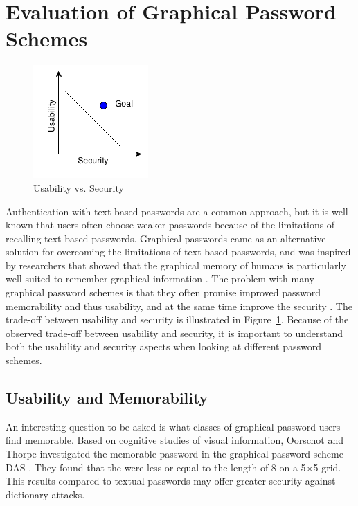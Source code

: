   \clearpage
 \section{Evaluation of Graphical Password Schemes} \label{sec:evaluation}

  \begin{figure}
    \vspace{-20pt}
    \begin{center}
      \includegraphics[scale=0.75]{pics/UsabilityVsSecurity.png}
    \end{center}
    \vspace{-20pt}
    \caption{Usability vs. Security}
    \vspace{-10pt}
    \label{fig:usabilitysecurity}
  \end{figure}

  Authentication with text-based passwords are a common approach, but it is well known that users often choose weaker passwords because of the limitations of recalling text-based passwords. Graphical passwords came as an alternative solution for overcoming the limitations of text-based passwords, and was inspired by researchers that showed that the graphical memory of humans is particularly well-suited to remember graphical information \cite{DeAngeli}. The problem with many graphical password schemes is that they often promise improved password memorability and thus usability, and at the same time improve the security \cite{Biddle}. The trade-off between usability and security is illustrated in Figure~\ref{fig:usabilitysecurity}. Because of the observed trade-off between usability and security, it is important to understand both the usability and security aspects when looking at different password schemes.

\subsection{Usability and Memorability} \label{sec:usability}

  An interesting question to be asked is what classes of graphical password users find memorable. Based on cognitive studies of visual information, Oorschot and Thorpe \cite{Thorpe1} investigated the memorable password in the graphical password scheme DAS \cite{Jermyn}. They found that the were less or equal to the length of 8 on a 5$\times$5 grid. This results compared to textual passwords may offer greater security against dictionary attacks.

